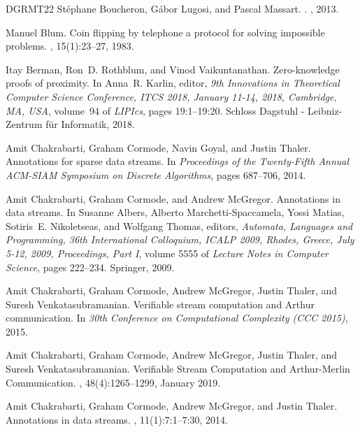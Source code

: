 \documentclass[10pt,a4paper]{article}
\theoremstyle{definition}
\begin{document}
\begin{thebibliography}{DGRMT22}
St{\'e}phane Boucheron, G{\'a}bor Lugosi, and Pascal Massart.
.
, 2013.

Manuel Blum.
\newblock Coin flipping by telephone a protocol for solving impossible problems.
, 15(1):23--27, 1983.

Itay Berman, Ron~D. Rothblum, and Vinod Vaikuntanathan.
\newblock Zero-knowledge proofs of proximity.
\newblock In Anna~R. Karlin, editor, {\em 9th {{Innovations}} in {{Theoretical Computer Science Conference}}, {{ITCS}} 2018, {{January}} 11-14, 2018, {{Cambridge}}, {{MA}}, {{USA}}}, volume~94 of {\em {{LIPIcs}}}, pages 19:1--19:20. {Schloss Dagstuhl - Leibniz-Zentrum f\"ur Informatik}, 2018.

Amit Chakrabarti, Graham Cormode, Navin Goyal, and Justin Thaler.
\newblock Annotations for sparse data streams.
\newblock In {\em Proceedings of the Twenty-Fifth Annual {{ACM-SIAM}} Symposium on Discrete Algorithms}, pages 687--706, 2014.

Amit Chakrabarti, Graham Cormode, and Andrew McGregor.
\newblock Annotations in data streams.
\newblock In Susanne Albers, Alberto {Marchetti-Spaccamela}, Yossi Matias, Sotiris~E. Nikoletseas, and Wolfgang Thomas, editors, {\em Automata, Languages and Programming, 36th International Colloquium, {{ICALP}} 2009, Rhodes, Greece, July 5-12, 2009, Proceedings, Part {{I}}}, volume 5555 of {\em Lecture Notes in Computer Science}, pages 222--234. {Springer}, 2009.

Amit Chakrabarti, Graham Cormode, Andrew McGregor, Justin Thaler, and Suresh Venkatasubramanian.
\newblock Verifiable stream computation and {{Arthur}} communication.
\newblock In {\em 30th Conference on Computational Complexity ({{CCC}} 2015)}, 2015.

Amit Chakrabarti, Graham Cormode, Andrew McGregor, Justin Thaler, and Suresh Venkatasubramanian.
\newblock Verifiable {{Stream Computation}} and {{Arthur-Merlin Communication}}.
, 48(4):1265--1299, January 2019.

Amit Chakrabarti, Graham Cormode, Andrew McGregor, and Justin Thaler.
\newblock Annotations in data streams.
, 11(1):7:1--7:30, 2014.


\end{thebibliography}
\end{document}
